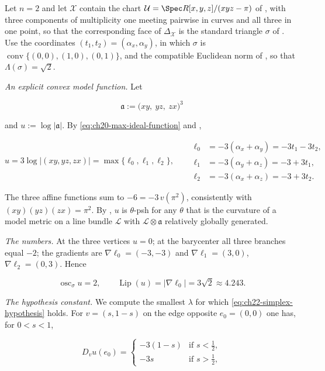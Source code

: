 \begin{example}
\label{ex:ch22-modulus-triangle}
Let \(n=2\) and let \(\mathcal X\) contain the chart
\(\mathcal U=\Spec R[x,y,z]/(xyz-\pi)\) of
, with three components of multiplicity one
meeting pairwise in curves and all three in one point, so that the
corresponding face of \(\Delta_{\mathcal X}\) is the standard triangle
\(\sigma\) of .  Use the coordinates
\((t_1,t_2)=(\alpha_x,\alpha_y)\), in which \(\sigma\) is
\(\operatorname{conv}\{(0,0),(1,0),(0,1)\}\), and the compatible Euclidean
norm of , so that
\(\Lambda(\sigma)=\sqrt2\).

\emph{An explicit convex model function.}  Let

\[
\mathfrak a:=\bigl(xy,\ yz,\ zx\bigr)^3
\]

and \(u:=\log|\mathfrak a|\).  By \eqref{eq:ch20-max-ideal-function} and
,

\[
 u=3\log|(xy,yz,zx)|=\max\{\ell_0,\ell_1,\ell_2\},
 \qquad
 \begin{aligned}
 \ell_0&=-3(\alpha_x+\alpha_y)=-3t_1-3t_2,\\
 \ell_1&=-3(\alpha_y+\alpha_z)=-3+3t_1,\\
 \ell_2&=-3(\alpha_x+\alpha_z)=-3+3t_2 .
 \end{aligned}
\tag{22.60}\label{eq:ch22-triangle-function}
\]

The three affine functions sum to \(-6=-3\,v(\pi^2)\), consistently with
\((xy)(yz)(zx)=\pi^2\).  By
, \(u\) is \(\theta\)-psh for any
\(\theta\) that is the curvature of a model metric on a line bundle
\(\mathcal L\) with \(\mathcal L\otimes\mathfrak a\) relatively globally
generated.

\emph{The numbers.}  At the three vertices \(u=0\); at the barycenter all
three branches equal \(-2\); the gradients are
\(\nabla\ell_0=(-3,-3)\) and \(\nabla\ell_1=(3,0)\),
\(\nabla\ell_2=(0,3)\).  Hence

\[
 \operatorname{osc}_\sigma u=2,
 \qquad
 \operatorname{Lip}(u)=|\nabla\ell_0|=3\sqrt2\approx4.243 .
\tag{22.61}\label{eq:ch22-triangle-numbers}
\]

\emph{The hypothesis constant.}  We compute the smallest \(\lambda\) for
which \eqref{eq:ch22-simplex-hypothesis} holds.  For \(v=(s,1-s)\) on the
edge opposite \(e_0=(0,0)\) one has, for \(0<s<1\),

\[
 D_vu(e_0)=
 \begin{cases}
  -3(1-s)&\text{if }s<\tfrac12,\\
  -3s&\text{if }s>\tfrac12,
 \end{cases}
\]


\end{example}
